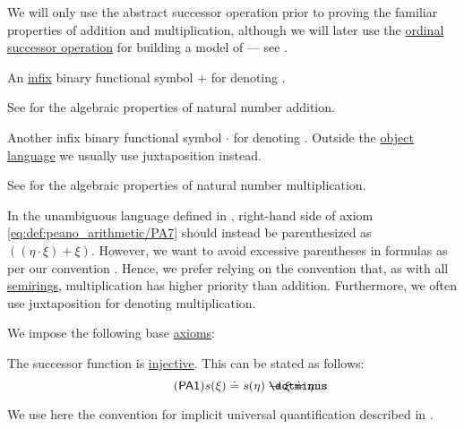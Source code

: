 \begin{definition}
\begin{thmenum}[series=def:peano_arithmetic]
    We will only use the abstract successor operation prior to proving the familiar properties of addition and multiplication, although we will later use the \hyperref[def:ordinal_successor]{ordinal successor operation} for building a model of  --- see .

     An \hyperref[rem:first_order_formula_conventions/infix]{infix} binary functional symbol \( + \) for denoting .

    See  for the algebraic properties of natural number addition.

     Another infix binary functional symbol \( \cdot \) for denoting . Outside the \hyperref[con:metalogic]{object language} we usually use juxtaposition instead.

    See  for the algebraic properties of natural number multiplication.

    In the unambiguous language defined in , right-hand side of axiom \eqref{eq:def:peano_arithmetic/PA7} should instead be parenthesized as \( ((\eta \cdot \xi) + \xi) \). However, we want to avoid excessive parentheses in formulas as per our convention . Hence, we prefer relying on the convention that, as with all \hyperref[def:semiring]{semirings}, multiplication has higher priority than addition. Furthermore, we often use juxtaposition for denoting multiplication.
  \end{thmenum}

  We impose the following base \hyperref[def:first_order_theory/axiomatized]{axioms}:
  \begin{thmenum}[resume=def:peano_arithmetic]
     The successor function is \hyperref[thm:function_invertibility_categorical/nonempty_left_invertible]{injective}. This can be stated as follows:
    \begin{equation}\label{eq:def:peano_arithmetic/PA1}\tag{\logic{PA1}}
      s(\xi) \syneq s(\eta) \synimplies \xi \syneq \eta.
    \end{equation}

    We use here the convention for implicit universal quantification described in .


\end{thmenum}
\end{definition}
